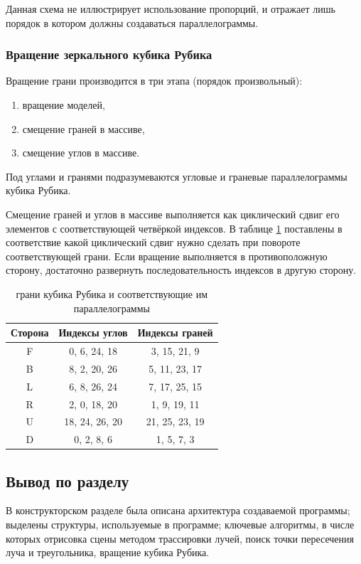 Данная схема не иллюстрирует использование пропорций, и отражает лишь порядок в котором должны создаваться параллелограммы.

\subsubsection{Вращение зеркального кубика Рубика}

Вращение грани производится в три этапа (порядок произвольный):
\begin{enumerate}
	\item вращение моделей,
	\item смещение граней в массиве,
	\item смещение углов в массиве.
\end{enumerate}

Под углами и гранями подразумеваются угловые и граневые параллелограммы кубика Рубика.

Смещение граней и углов в массиве выполняется как циклический сдвиг его элементов с соответствующей четвёркой индексов. В таблице \ref{tabular:cube_indexes} поставлены в соответствие какой циклический сдвиг нужно сделать при повороте соответствующей грани. Если вращение выполняется в противоположную сторону, достаточно развернуть последовательность индексов в другую сторону.

\begin{table}
	\centering
	\caption{грани кубика Рубика и соответствующие им параллелограммы}
	\label{tabular:cube_indexes}
	\begin{tabular}{|c|c|c|}
		\hline
		Сторона & Индексы углов & Индексы граней \\
		\hline
		\hline
		F & 0, 6, 24, 18	& 3, 15, 21, 9		\\ \hline
		B & 8, 2, 20, 26	& 5, 11, 23, 17		\\ \hline
		L & 6, 8, 26, 24	& 7, 17, 25, 15		\\ \hline
		R & 2, 0, 18, 20	& 1, 9, 19, 11		\\ \hline
		U & 18, 24, 26, 20	& 21, 25, 23, 19	\\ \hline
		D & 0, 2, 8, 6		& 1, 5, 7, 3		\\ \hline
	\end{tabular}
\end{table}

\subsection{Вывод по разделу}
В конструкторском разделе была описана архитектура создаваемой программы;
выделены структуры, используемые в программе;
ключевые алгоритмы, в числе которых отрисовка сцены методом трассировки лучей,
поиск точки пересечения луча и треугольника, вращение кубика Рубика.

